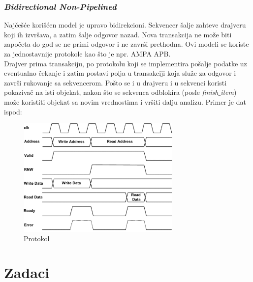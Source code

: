

\subsubsection{\emph{Bidirectional Non-Pipelined}}

Najčešće korišćen model je upravo bidirekcioni. Sekvencer šalje zahteve drajveru
koji ih izvršava, a zatim šalje odgovor nazad. Nova transakcija ne može biti
započeta do god se ne primi odgovor i ne završi prethodna. Ovi modeli se koriste
za jednostavnije protokole kao što je npr. AMPA APB.\\

Drajver prima transakciju, po protokolu koji se implementira pošalje podatke uz
eventualno čekanje i zatim postavi polja u transakciji koja služe za odgovor i
završi rukovanje sa sekvencerom. Pošto se i u drajveru i u sekvenci koristi
pokazivač na isti objekat, nakon što se sekvenca odblokira (posle
\emph{finish\(\_\)item}) može koristiti objekat sa novim vrednostima i vršiti
dalju analizu. Primer je dat ispod:

\begin{figure}[h!]
  \center
  \includegraphics[width=80mm, scale=0.5]{img/v7_bidir_protocol.png}
  \caption{Protokol}
  \label{fig:bidir_protocol}
\end{figure}




\section{Zadaci}


